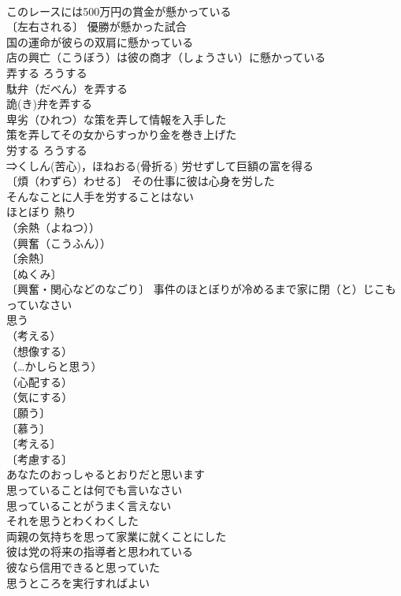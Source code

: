 \documentclass[8pt]{extreport}
\begin{document}
\begin{CJK}{UTF8}{min}
\\	このレースには500万円の賞金が懸かっている 
\\	〔左右される〕 優勝が懸かった試合 
\\	国の運命が彼らの双肩に懸かっている 
\\	店の興亡（こうぼう）は彼の商才（しょうさい）に懸かっている 
\\	弄する	ろうする	
\\	駄弁（だべん）を弄する 
\\	詭(き)弁を弄する 
\\	卑劣（ひれつ）な策を弄して情報を入手した 
\\	策を弄してその女からすっかり金を巻き上げた 
\\	労する	ろうする	
\\	⇒くしん(苦心)，ほねおる(骨折る) 労せずして巨額の富を得る 
\\	〔煩（わずら）わせる〕 その仕事に彼は心身を労した 
\\	そんなことに人手を労することはない 
\\	ほとぼり	熱り	
\\	（余熱（よねつ））
\\	（興奮（こうふん））
\\	〔余熱〕
\\	〔ぬくみ〕
\\	〔興奮・関心などのなごり〕 事件のほとぼりが冷めるまで家に閉（と）じこもっていなさい 
\\	思う		
\\	（考える）
\\	（想像する）
\\	（…かしらと思う）
\\	（心配する）
\\	（気にする）
\\	〔願う〕
\\	〔慕う〕
\\	〔考える〕
\\	〔考慮する〕
\\	あなたのおっしゃるとおりだと思います 
\\	思っていることは何でも言いなさい 
\\	思っていることがうまく言えない 
\\	それを思うとわくわくした 
\\	両親の気持ちを思って家業に就くことにした 
\\	彼は党の将来の指導者と思われている 
\\	彼なら信用できると思っていた 
\\	思うところを実行すればよい 

\end{CJK}
\end{document}
